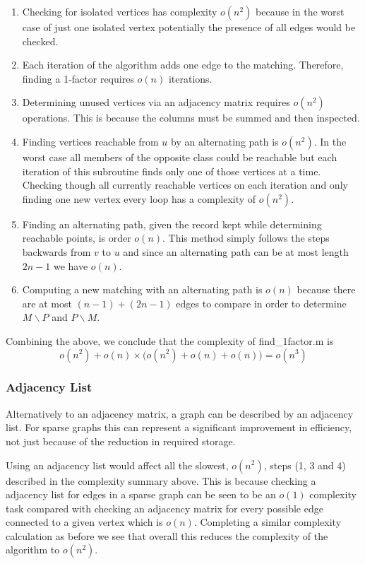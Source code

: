 \documentclass[a4paper]{article}
\begin{document}
\begin{enumerate}
    \item
    Checking for isolated vertices has complexity $o(n^2)$ because in the worst case of just one isolated vertex potentially the presence of all edges would be checked.
    \item
    Each iteration of the algorithm adds one edge to the matching. Therefore, finding a 1-factor requires $o(n)$ iterations.
    \item
    Determining unused vertices via an adjacency matrix requires $o(n^2)$ operations. This is because the columns must be summed and then inspected.
    \item
    Finding vertices reachable from $u$ by an alternating path is $o(n^2)$. In the worst case all members of the opposite class could be reachable but each iteration of this subroutine finds only one of those vertices at a time. Checking though all currently reachable vertices on each iteration and only finding one new vertex every loop has a complexity of $o(n^2)$.
    \item
    Finding an alternating path, given the record kept while determining reachable points, is order $o(n)$. This method simply follows the steps backwards from $v$ to $u$ and since an alternating path can be at most length $2n-1$ we have $o(n)$.
    \item
    Computing a new matching with an alternating path is $o(n)$ because there are at most $(n-1) + (2n-1)$ edges to compare in order to determine $M\backslash P$ and $P\backslash M$.
\end{enumerate}
Combining the above, we conclude that the complexity of find\_1factor.m is
\[ o(n^2) + o(n) \times \big( o(n^2) + o(n) + o(n) \big) = o(n^3) \]

\subsubsection*{Adjacency List}
Alternatively to an adjacency matrix, a graph can be described by an adjacency list. For sparse graphs this can represent a significant improvement in efficiency, not just because of the reduction in required storage.

\bigskip
Using an adjacency list would affect all the slowest, $o(n^2)$, steps (1, 3 and 4) described in the complexity summary above. This is because checking a adjacency list for edges in a sparse graph can be seen to be an $o(1)$ complexity task compared with checking an adjacency matrix for every possible edge connected to a given vertex which is $o(n)$. Completing a similar complexity calculation as before we see that overall this reduces the complexity of the algorithm to $o(n^2)$.
\end{document}
